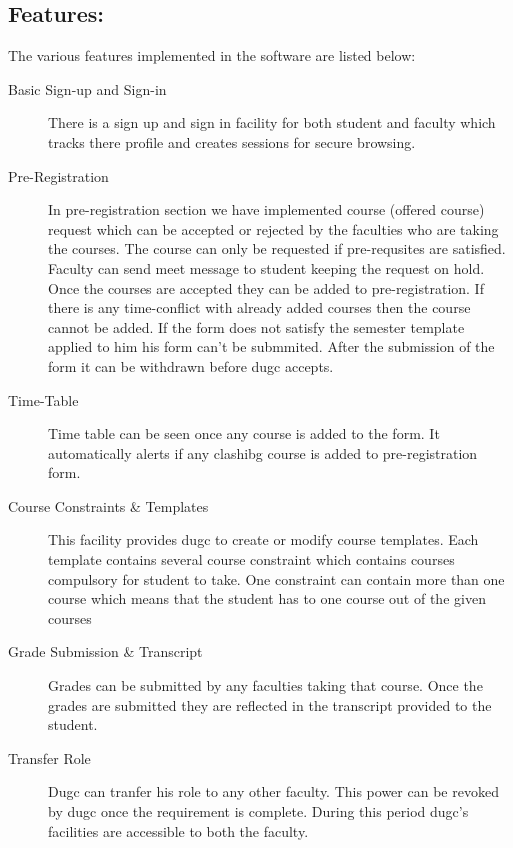 \documentclass[letterpaper,12pt]{article}
\begin{document}
\subsection{Features:}
The various features implemented in the software are listed below:
\begin{description}
\item[Basic Sign-up and Sign-in]
There is a sign up and sign in facility for both student and faculty which
tracks there profile and creates sessions for secure browsing.
\item[Pre-Registration]
 In pre-registration section we have implemented course (offered course) request
 which can be accepted or rejected by the faculties who are taking the courses.
 The course can only be requested if pre-requsites are satisfied. Faculty can send
 meet message to student keeping the request on hold.
 Once the courses are accepted they can be added to pre-registration. If there is any 
 time-conflict with already added courses then the course cannot be added.
 If the form does not satisfy the semester template applied to him his form can't be submmited.
 After the submission of the form it can be withdrawn before dugc accepts.
 \item[Time-Table]
 Time table can be seen once any course is added to the form. It automatically alerts if any 
 clashibg course is added to pre-registration form.
 \item[Course Constraints \& Templates]
 This facility provides dugc to create or modify course templates. Each template contains 
 several course constraint which contains courses compulsory for student to take. One constraint
 can contain more than one course which means that the student has to one course out of the given courses
 \item[Grade Submission \& Transcript]
 Grades can be submitted by any faculties taking that
 course. Once the grades are submitted they are reflected in the transcript provided to the student.
 \item[Transfer Role]
Dugc can tranfer his role to any other faculty. This power can be revoked by dugc once the requirement
is complete. During this period dugc's facilities are accessible to both the faculty.
\end{description}
\end{document}
